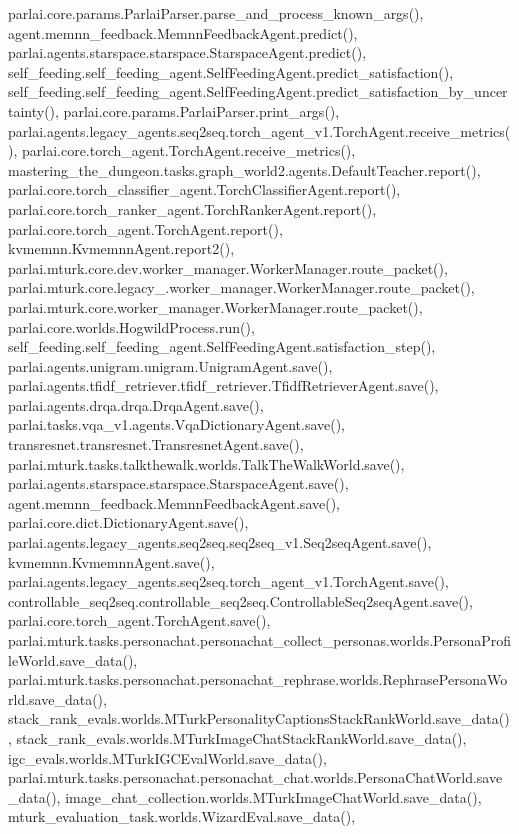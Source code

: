 parlai.\+core.\+params.\+Parlai\+Parser.\+parse\+\_\+and\+\_\+process\+\_\+known\+\_\+args(), agent.\+memnn\+\_\+feedback.\+Memnn\+Feedback\+Agent.\+predict(), parlai.\+agents.\+starspace.\+starspace.\+Starspace\+Agent.\+predict(), self\+\_\+feeding.\+self\+\_\+feeding\+\_\+agent.\+Self\+Feeding\+Agent.\+predict\+\_\+satisfaction(), self\+\_\+feeding.\+self\+\_\+feeding\+\_\+agent.\+Self\+Feeding\+Agent.\+predict\+\_\+satisfaction\+\_\+by\+\_\+uncertainty(), parlai.\+core.\+params.\+Parlai\+Parser.\+print\+\_\+args(), parlai.\+agents.\+legacy\+\_\+agents.\+seq2seq.\+torch\+\_\+agent\+\_\+v1.\+Torch\+Agent.\+receive\+\_\+metrics(), parlai.\+core.\+torch\+\_\+agent.\+Torch\+Agent.\+receive\+\_\+metrics(), mastering\+\_\+the\+\_\+dungeon.\+tasks.\+graph\+\_\+world2.\+agents.\+Default\+Teacher.\+report(), parlai.\+core.\+torch\+\_\+classifier\+\_\+agent.\+Torch\+Classifier\+Agent.\+report(), parlai.\+core.\+torch\+\_\+ranker\+\_\+agent.\+Torch\+Ranker\+Agent.\+report(), parlai.\+core.\+torch\+\_\+agent.\+Torch\+Agent.\+report(), kvmemnn.\+Kvmemnn\+Agent.\+report2(), parlai.\+mturk.\+core.\+dev.\+worker\+\_\+manager.\+Worker\+Manager.\+route\+\_\+packet(), parlai.\+mturk.\+core.\+legacy\+\_.\+worker\+\_\+manager.\+Worker\+Manager.\+route\+\_\+packet(), parlai.\+mturk.\+core.\+worker\+\_\+manager.\+Worker\+Manager.\+route\+\_\+packet(), parlai.\+core.\+worlds.\+Hogwild\+Process.\+run(), self\+\_\+feeding.\+self\+\_\+feeding\+\_\+agent.\+Self\+Feeding\+Agent.\+satisfaction\+\_\+step(), parlai.\+agents.\+unigram.\+unigram.\+Unigram\+Agent.\+save(), parlai.\+agents.\+tfidf\+\_\+retriever.\+tfidf\+\_\+retriever.\+Tfidf\+Retriever\+Agent.\+save(), parlai.\+agents.\+drqa.\+drqa.\+Drqa\+Agent.\+save(), parlai.\+tasks.\+vqa\+\_\+v1.\+agents.\+Vqa\+Dictionary\+Agent.\+save(), transresnet.\+transresnet.\+Transresnet\+Agent.\+save(), parlai.\+mturk.\+tasks.\+talkthewalk.\+worlds.\+Talk\+The\+Walk\+World.\+save(), parlai.\+agents.\+starspace.\+starspace.\+Starspace\+Agent.\+save(), agent.\+memnn\+\_\+feedback.\+Memnn\+Feedback\+Agent.\+save(), parlai.\+core.\+dict.\+Dictionary\+Agent.\+save(), parlai.\+agents.\+legacy\+\_\+agents.\+seq2seq.\+seq2seq\+\_\+v1.\+Seq2seq\+Agent.\+save(), kvmemnn.\+Kvmemnn\+Agent.\+save(), parlai.\+agents.\+legacy\+\_\+agents.\+seq2seq.\+torch\+\_\+agent\+\_\+v1.\+Torch\+Agent.\+save(), controllable\+\_\+seq2seq.\+controllable\+\_\+seq2seq.\+Controllable\+Seq2seq\+Agent.\+save(), parlai.\+core.\+torch\+\_\+agent.\+Torch\+Agent.\+save(), parlai.\+mturk.\+tasks.\+personachat.\+personachat\+\_\+collect\+\_\+personas.\+worlds.\+Persona\+Profile\+World.\+save\+\_\+data(), parlai.\+mturk.\+tasks.\+personachat.\+personachat\+\_\+rephrase.\+worlds.\+Rephrase\+Persona\+World.\+save\+\_\+data(), stack\+\_\+rank\+\_\+evals.\+worlds.\+M\+Turk\+Personality\+Captions\+Stack\+Rank\+World.\+save\+\_\+data(), stack\+\_\+rank\+\_\+evals.\+worlds.\+M\+Turk\+Image\+Chat\+Stack\+Rank\+World.\+save\+\_\+data(), igc\+\_\+evals.\+worlds.\+M\+Turk\+I\+G\+C\+Eval\+World.\+save\+\_\+data(), parlai.\+mturk.\+tasks.\+personachat.\+personachat\+\_\+chat.\+worlds.\+Persona\+Chat\+World.\+save\+\_\+data(), image\+\_\+chat\+\_\+collection.\+worlds.\+M\+Turk\+Image\+Chat\+World.\+save\+\_\+data(), mturk\+\_\+evaluation\+\_\+task.\+worlds.\+Wizard\+Eval.\+save\+\_\+data(), 
